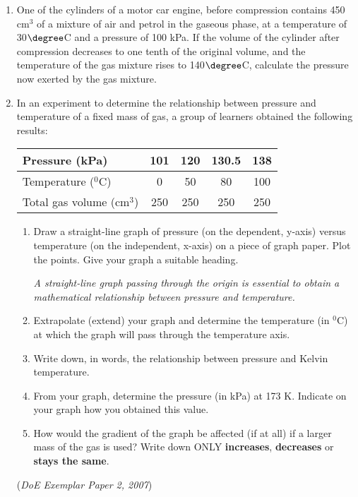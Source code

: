 {\begin{enumerate}
{(\textit{IEB 2003 Paper 2})
}

\item{One of the cylinders of a motor car engine, before compression contains 450 cm$^{3}$ of a mixture of air and petrol in the gaseous phase, at a temperature of 30$\degree$C and a pressure of 100 kPa. If the volume of the cylinder after compression decreases to one tenth of the original volume, and the temperature of the gas mixture rises to 140$\degree$C, calculate the pressure now exerted by the gas mixture.}

\item{In an experiment to determine the relationship between pressure and temperature of a fixed mass of gas, a group of learners obtained the following results:}

\begin{center}
\begin{tabular}{|l|c|c|c|c|}\hline
Pressure (kPa) & 101 & 120 & 130.5 & 138 \\\hline
Temperature ($^{0}$C) & 0 & 50 & 80 & 100 \\\hline
Total gas volume (cm$^{3}$) & 250 & 250 & 250 & 250 \\\hline
\end{tabular}
\end{center}

	\begin{enumerate}
	\item{Draw a straight-line graph of pressure (on the dependent, y-axis) versus temperature (on the independent, x-axis) on a piece of graph paper. Plot the points. Give your graph a suitable heading.}

\textit{A straight-line graph passing through the origin is essential to obtain a mathematical relationship between pressure and temperature.}

	\item{Extrapolate (extend) your graph and determine the temperature (in $^{0}$C) at which the graph will pass through the temperature axis.}
	\item{Write down, in words, the relationship between pressure and Kelvin temperature.}
	\item{From your graph, determine the pressure (in kPa) at 173 K. Indicate on your graph how you obtained this value.}
	\item{How would the gradient of the graph be affected (if at all) if a larger mass of the gas is used? Write down ONLY \textbf{increases}, \textbf{decreases} or \textbf{stays the same}.}
	\end{enumerate}

(\textit{DoE Exemplar Paper 2, 2007})


\end{enumerate}
}



